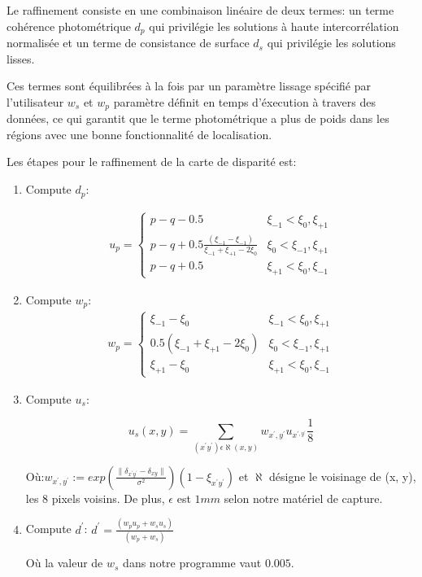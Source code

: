 \documentclass[a4paper,11pt]{article}
\begin{document}
Le raffinement consiste en une combinaison linéaire de deux termes: un terme cohérence photométrique $d_p$ qui privilégie les solutions à haute intercorrélation normalisée et un terme de consistance de surface $d_s$ qui privilégie les solutions lisses.

Ces termes sont équilibrées à la fois par un paramètre lissage spécifié par l'utilisateur $w_s$ et $w_p$ paramètre définit en temps d'éxecution à travers des données, ce qui garantit que le terme photométrique a plus de poids dans les régions avec une bonne fonctionnalité de localisation.

Les étapes pour le raffinement de la carte de disparité est:
\begin{enumerate}
\item Compute $d_p$:

\begin{eqnarray*}
u_{p}=\begin{cases}
p-q-0.5 & \xi_{-1}<\xi_{0},\xi_{+1}\\
p-q+0.5\frac{(\xi_{-1}-\xi_{-1})}{\xi_{-1}+\xi_{+1}-2\xi_{0}} & \xi_{0}<\xi_{-1},\xi_{+1}\\
p-q+0.5 & \xi_{+1}<\xi_{0},\xi_{-1}
\end{cases}
\end{eqnarray*}

\item Compute $w_p$:
\begin{eqnarray*}
w_{p}=\begin{cases}
\xi_{-1}-\xi_{0} & \xi_{-1}<\xi_{0},\xi_{+1}\\
0.5(\xi_{-1}+\xi_{+1}-2\xi_{0}) & \xi_{0}<\xi_{-1},\xi_{+1}\\
\xi_{+1}-\xi_{0} & \xi_{+1}<\xi_{0},\xi_{-1}
\end{cases}
\end{eqnarray*}

\item Compute $u_s$:

\[
u_{s}(x,y)=\sum_{(x^{'}y^{'})\epsilon\aleph(x,y)}w_{x^{'},y^{'}}u_{x^{',y^{'}}}\frac{1}{8}
\]

Où:$w_{x^{'},y^{'}}:=exp\left(\frac{\parallel\delta_{x^{'}y^{'}}-\delta_{xy}\parallel}{\sigma^{2}}\right)(1-\xi_{x^{'}y^{'}})$ et $\aleph$ désigne le voisinage de (x, y), les 8 pixels voisins. De plus, $\epsilon$ est $1mm$ selon notre matériel de capture.

\item Compute $d^{'}$:
$d^{'}=\frac{(w_{p}u_{p}+w_{s}u_{s})}{(w_{p}+w_{s})}$

Où la valeur de $w_{s}$ dans notre programme vaut $0.005$.

\end{enumerate}
\end{document}
